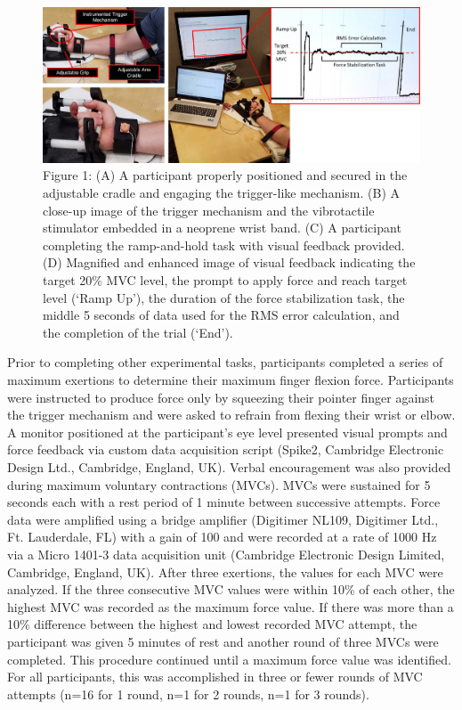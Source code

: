 \documentclass[]{cik}%
\begin{document}
\begin{figure}

{\centering \includegraphics[width=1\textwidth,height=\textheight]{./figures/fig1.pdf}

}

\caption{\label{fig-1}Figure 1: (A) A participant properly positioned
and secured in the adjustable cradle and engaging the trigger-like
mechanism. (B) A close-up image of the trigger mechanism and the
vibrotactile stimulator embedded in a neoprene wrist band. (C) A
participant completing the ramp-and-hold task with visual feedback
provided. (D) Magnified and enhanced image of visual feedback indicating
the target 20\% MVC level, the prompt to apply force and reach target
level (`Ramp Up'), the duration of the force stabilization task, the
middle 5 seconds of data used for the RMS error calculation, and the
completion of the trial (`End').}

\end{figure}

Prior to completing other experimental tasks, participants completed a
series of maximum exertions to determine their maximum finger flexion
force. Participants were instructed to produce force only by squeezing
their pointer finger against the trigger mechanism and were asked to
refrain from flexing their wrist or elbow. A monitor positioned at the
participant's eye level presented visual prompts and force feedback via
custom data acquisition script (Spike2, Cambridge Electronic Design
Ltd., Cambridge, England, UK). Verbal encouragement was also provided
during maximum voluntary contractions (MVCs). MVCs were sustained for 5
seconds each with a rest period of 1 minute between successive attempts.
Force data were amplified using a bridge amplifier (Digitimer NL109,
Digitimer Ltd., Ft. Lauderdale, FL) with a gain of 100 and were recorded
at a rate of 1000 Hz via a Micro 1401-3 data acquisition unit (Cambridge
Electronic Design Limited, Cambridge, England, UK). After three
exertions, the values for each MVC were analyzed. If the three
consecutive MVC values were within 10\% of each other, the highest MVC
was recorded as the maximum force value. If there was more than a 10\%
difference between the highest and lowest recorded MVC attempt, the
participant was given 5 minutes of rest and another round of three MVCs
were completed. This procedure continued until a maximum force value was
identified. For all participants, this was accomplished in three or
fewer rounds of MVC attempts (n=16 for 1 round, n=1 for 2 rounds, n=1
for 3 rounds).
\end{document}
